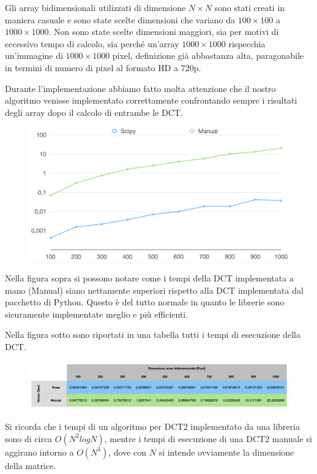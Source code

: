 \documentclass[preprint,12pt]{elsarticle}
\begin{document}
	Gli array bidimensionali utilizzati di dimensione $N \times N$ sono stati creati in maniera casuale e sono state scelte dimensioni che variano da $100 \times 100$ a $1000 \times 1000$. Non sono state scelte dimensioni maggiori, sia per motivi di eccessivo tempo di calcolo, sia perché un'array $1000 \times 1000$ rispecchia un'immagine di $1000 \times 1000$ pixel, definizione già abbastanza alta, paragonabile in termini di numero di pixel al formato HD a 720p.
	
	Durante l'implementazione abbiamo fatto molta attenzione che il nostro algoritmo venisse implementato correttamente confrontando sempre i risultati degli array dopo il calcolo di entrambe le DCT.
	
	\begin{figure}[H]
		\centering
		\includegraphics[width=\linewidth]{grafico}
	\end{figure}
	
	Nella figura sopra si possono notare come i tempi della DCT implementata a mano (Manual) siano nettamente superiori rispetto alla DCT implementata dal pacchetto di Python. Questo è del tutto normale in quanto le librerie sono sicuramente implementate meglio e più efficienti.
	
	\newpage
	Nella figura sotto sono riportati in una tabella tutti i tempi di esecuzione della DCT.
	
	\begin{figure}[H]
		\centering
		\includegraphics[width=\linewidth]{tabella}
	\end{figure}
	
	Si ricorda che i tempi di un algoritmo per DCT2 implementato da una libreria sono di circa $O(N^2 logN)$, mentre i tempi di esecuzione di una DCT2 manuale si aggirano intorno a $O(N^3)$, dove con $N$ si intende ovviamente la dimensione della matrice.
	
\end{document}
